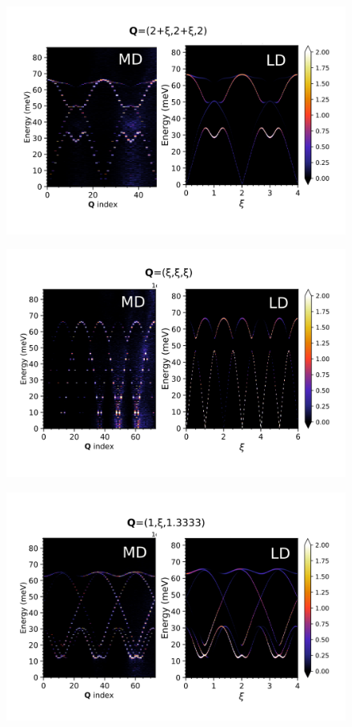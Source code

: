 \documentclass[prl,preprint,aps,superscriptaddress,floatfix]{revtex4-2}
\begin{document}
\begin{figure}
  \includegraphics[width=\linewidth]{./figs/path_1.png}
        \caption{}
\label{fig:path_1}
\end{figure}

\begin{figure}
  \includegraphics[width=\linewidth]{./figs/path_2.png}
        \caption{}
\label{fig:path_2}
\end{figure}

\begin{figure}
  \includegraphics[width=\linewidth]{./figs/path_3.png}
        \caption{}
\label{fig:path_3}
\end{figure}
\end{document}
